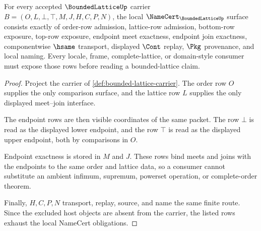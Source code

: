 \begin{theorem}
\label{thm:bounded-lattice-namecert-obligations}
For every accepted $\BoundedLatticeUp$ carrier $B=(O,L,\bot,\top,M,J,H,C,P,N)$, the local $\NameCert_{\BoundedLatticeUp}$ surface consists exactly of order-row admission, lattice-row admission, bottom-row exposure, top-row exposure, endpoint meet exactness, endpoint join exactness, componentwise $\hsame$ transport, displayed $\Cont$ replay, $\Pkg$ provenance, and local naming. Every locale, frame, complete-lattice, or domain-style consumer must expose those rows before reading a bounded-lattice claim.
\end{theorem}
\begin{proof}
Project the carrier of \autoref{def:bounded-lattice-carrier}. The order row $O$ supplies the only comparison surface, and the lattice row $L$ supplies the only displayed meet--join interface.

The endpoint rows are then visible coordinates of the same packet. The row $\bot$ is read as the displayed lower endpoint, and the row $\top$ is read as the displayed upper endpoint, both by comparisons in $O$.

Endpoint exactness is stored in $M$ and $J$. These rows bind meets and joins with the endpoints to the same order and lattice data, so a consumer cannot substitute an ambient infimum, supremum, powerset operation, or complete-order theorem.

Finally, $H,C,P,N$ transport, replay, source, and name the same finite route. Since the excluded host objects are absent from the carrier, the listed rows exhaust the local NameCert obligations.
\end{proof}

